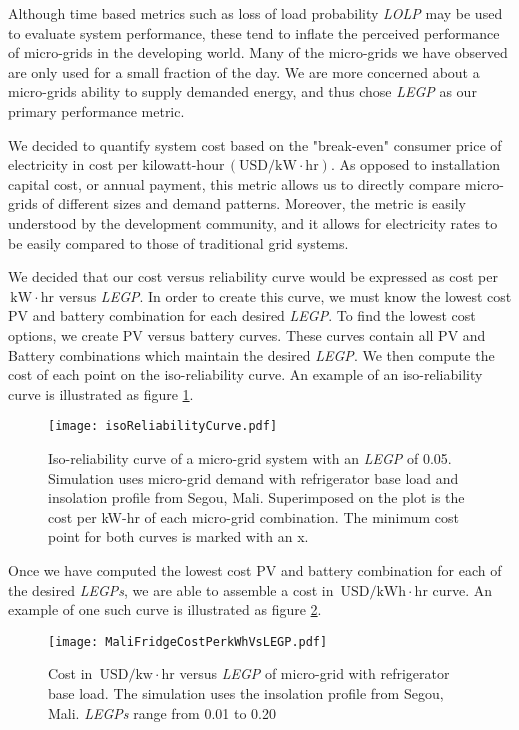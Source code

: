 \documentclass{article}
\newcommand{\unit}[1]{\ensuremath{\, \mathrm{#1}}}
\begin{document}
Although time based metrics such as loss of load probability \emph{LOLP} may be used to evaluate system performance, these tend to inflate the perceived performance of micro-grids in the developing world.
Many of the micro-grids we have observed are only used for a small fraction of the day.
We are more concerned about a micro-grids ability to supply demanded energy, and thus chose \emph{LEGP} as our primary performance metric.

We decided to quantify system cost based on the "break-even" consumer price of electricity in cost per kilowatt-hour\unit{(USD/kW\! \cdot \! hr)}.
As opposed to installation capital cost, or annual payment, this metric allows us to directly compare micro-grids of different sizes and demand patterns.
Moreover, the metric is easily understood by the development community, and it allows for electricity rates to be easily compared to those of traditional grid systems.
 
We decided that our cost versus reliability curve would be expressed as cost per \unit{kW \! \cdot \! hr} versus \emph{LEGP}.
In order to create this curve, we must know the lowest cost PV and battery combination for each desired \emph{LEGP}.
To find the lowest cost options, we create PV versus battery curves.
These curves contain all PV and Battery combinations which maintain the desired \emph{LEGP}. 
We then compute the cost of each point on the iso-reliability curve.
An example of an iso-reliability curve is illustrated as figure \ref{energyBalance}.
%
%
\begin{figure}[ht] 
  \centering
    \texttt{[image: isoReliabilityCurve.pdf]}
  \caption{Iso-reliability curve of a micro-grid system with an \emph{LEGP} of 0.05. 
Simulation uses micro-grid demand with refrigerator base load and insolation profile from Segou, Mali.
Superimposed on the plot is the cost per kW-hr of each micro-grid combination.
The minimum cost point for both curves is marked with an x.}
\label{energyBalance}
\end{figure}
%
%
Once we have computed the lowest cost PV and battery combination for each of the desired \emph{LEGPs}, we are able to assemble a cost in \unit{USD/kWh\! \cdot \!hr} curve. 
An example of one such curve is illustrated as figure \ref{MaliFridgeCostPerkWhVsLEGP}.
%
%
\begin{figure}[ht] 
  \centering
    \texttt{[image: MaliFridgeCostPerkWhVsLEGP.pdf]}
  \caption{Cost in \unit{USD/kw\! \cdot \! hr} versus \emph{LEGP} of 
micro-grid with refrigerator base load.
The simulation uses the insolation profile from Segou, Mali.
\emph{LEGPs} range from 0.01 to 0.20}
\label{MaliFridgeCostPerkWhVsLEGP}
\end{figure}
\end{document}
